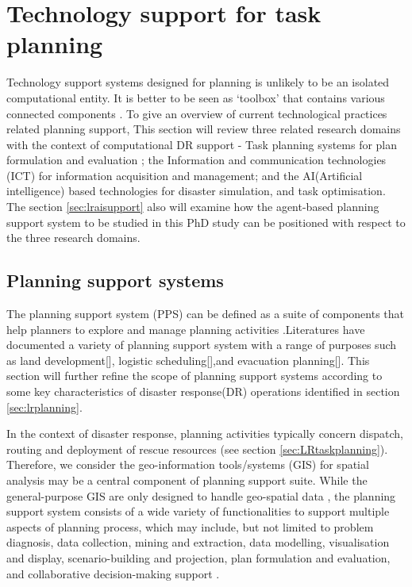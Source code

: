 \section{Technology support for task planning}
Technology support systems designed for planning is unlikely to be an isolated computational entity. It is better to be seen as `toolbox' that contains various connected components \cite{Wattegama2012}. To give an overview of current technological practices related planning support, This section will review three related research domains with the context of computational DR support - Task planning systems for plan formulation and evaluation ; the Information and communication technologies (ICT) for information acquisition and management; and the AI(Artificial intelligence) based technologies for disaster simulation, and task optimisation. The section \ref{sec:lraisupport} also will examine how the agent-based planning support system to be studied in this PhD study can be positioned with respect to the three research domains. \\

\subsection{Planning support systems}
The planning support system (PPS) can be defined as a suite of components that help planners to explore and manage planning activities \cite{Geertman2004}.Literatures have documented a variety of planning support system with a range of purposes such as land development[], logistic scheduling[],and evacuation planning[]. This section will further refine the scope of planning support systems according to some key characteristics of disaster response(DR) operations identified in section \ref{sec:lrplanning}.

In the context of disaster response, planning activities  typically concern dispatch, routing and deployment of rescue resources (see section \ref{sec:LRtaskplanning}). Therefore, we consider the geo-information tools/systems (GIS) for spatial analysis may be a central component of planning support suite. While the general-purpose GIS  are only designed to handle geo-spatial data \cite{Geertman2004}, the planning support system consists of a wide variety of functionalities to support multiple aspects of planning process, which may include, but not limited to problem diagnosis, data collection, mining and extraction, data modelling, visualisation and display, scenario-building and projection, plan formulation and evaluation, and collaborative decision-making support \cite{Geertman2004}. \\

